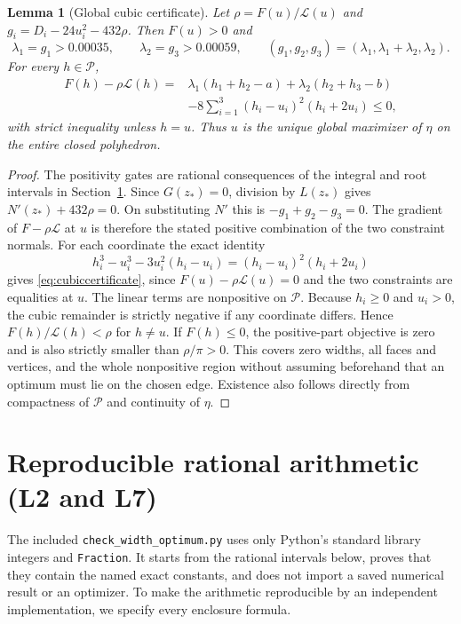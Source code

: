\documentclass[11pt,a4paper]{article}
\newtheorem{lemma}[theorem]{Lemma}
\theoremstyle{remark}\newtheorem{remark}[theorem]{Remark}
\begin{document}
\begin{lemma}[Global cubic certificate]\label{lem:KKT}
Let $\rho=F(u)/\mathcal L(u)$ and
$g_i=D_i-24u_i^2-432\rho$. Then $F(u)>0$ and
\[
\lambda_1=g_1>0.00035,\qquad \lambda_2=g_3>0.00059,
\qquad(g_1,g_2,g_3)=(\lambda_1,\lambda_1+\lambda_2,\lambda_2).
\]
For every $h\in\mathcal P$,
\begin{align}\label{eq:cubiccertificate}
F(h)-\rho\mathcal L(h)
={}&\lambda_1(h_1+h_2-a)+\lambda_2(h_2+h_3-b)\nonumber\\
&-8\sum_{i=1}^3(h_i-u_i)^2(h_i+2u_i)\le0,
\end{align}
with strict inequality unless $h=u$. Thus $u$ is the unique global
maximizer of $\eta$ on the entire closed polyhedron.
\end{lemma}
\begin{proof}
The positivity gates are rational consequences of the integral and root
intervals in Section~\ref{sec:arithmetic}. Since $G(z_*)=0$, division
by $L(z_*)$ gives $N'(z_*)+432\rho=0$. On substituting $N'$ this is
$-g_1+g_2-g_3=0$. The gradient of $F-\rho\mathcal L$ at $u$ is
therefore the stated positive combination of the two constraint normals.
For each coordinate the exact identity
\[
h_i^3-u_i^3-3u_i^2(h_i-u_i)=(h_i-u_i)^2(h_i+2u_i)
\]
gives \eqref{eq:cubiccertificate}, since $F(u)-\rho\mathcal L(u)=0$
and the two constraints are equalities at $u$. The linear terms are
nonpositive on $\mathcal P$. Because $h_i\ge0$ and $u_i>0$, the cubic
remainder is strictly negative if any coordinate differs. Hence
$F(h)/\mathcal L(h)<\rho$ for $h\ne u$. If $F(h)\le0$, the
positive-part objective is zero and is also strictly smaller than
$\rho/\pi>0$. This covers zero widths, all faces and vertices, and the
whole nonpositive region without assuming beforehand that an optimum
must lie on the chosen edge. Existence also follows directly from
compactness of $\mathcal P$ and continuity of $\eta$.
\end{proof}

\section{Reproducible rational arithmetic (L2 and L7)}\label{sec:arithmetic}
The included \texttt{check\_width\_optimum.py} uses only Python's standard
library integers and \texttt{Fraction}. It starts from the rational
intervals below, proves that they contain the named exact constants,
and does not import a saved numerical result or an optimizer. To make
the arithmetic reproducible by an independent implementation, we specify
every enclosure formula.
\end{document}
